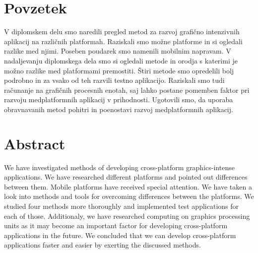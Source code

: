 \chapter*{Povzetek}

V diplomskem delu smo naredili pregled metod za razvoj grafično intenzivnih aplikacij na različnih platformah. Raziskali smo možne platforme in si ogledali razlike med njimi. Poseben poudarek smo namenili mobilnim napravam. V nadaljevanju diplomskega dela smo si ogledali metode in orodja s katerimi je možno razlike med platformami premostiti. Štiri metode smo opredelili bolj podrobno in za vsako od teh razvili testno aplikacijo. Raziskali smo tudi računanje na grafičnih procesnih enotah, saj lahko postane pomemben faktor pri razvoju medplatformnih aplikacij v prihodnosti. Ugotovili smo, da uporaba obravnavanih metod pohitri in poenostavi razvoj medplatformnih aplikacij.

\clearemptydoublepage

\chapter*{Abstract}


We have investigated methods of developing cross-platform graphics-intense applications. We have researched different platforms and pointed out differences between them. Mobile platforms have received special attention. We have taken a look into methods and tools for overcoming differences between the platforms. We studied four methods more thoroughly and implemented test applications for each of those. Additionaly, we have researched computing on graphics processing units as it may become an important factor for developing cross-platform applications in the future. We concluded that we can develop cross-platform applications faster and easier by exerting the discussed methods.

